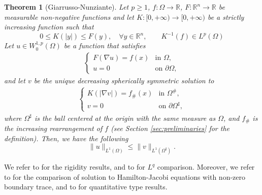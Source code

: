 \documentclass[oneside,a4paper,12pt,notitlepage]{article}
\newtheorem{theorem}{Theorem}[section]
\theoremstyle{definition}
\newcommand{\R}{\mathbb{R}}
\begin{document}
\begin{theorem}[Giarrusso-Nunziante]
  Let $p\geq 1$, $f: \Omega \rightarrow \R$, $F:\R^n\rightarrow \R$ be measurable non-negative functions and let $K:[0,+\infty)\rightarrow [0,+\infty)$ be a strictly increasing  function such that
    \[
0 \leq K(|y|) \leq F(y), \quad \forall y \in \mathbb{R}^n, \quad \quad K^{-1}(f) \in L^p(\Omega)
\]
    Let $u \in W^{1,p}_{0}(\Omega)$ be a function that satisfies
    \begin{align}
\label{hamilton_jacobi}
    \begin{cases}
        F(\nabla u) = f(x) & \text{in } \Omega, \\
        u = 0 & \text{on } \partial \Omega,
    \end{cases}
\end{align}
and let $v$ be the unique decreasing spherically symmetric solution to
\begin{align}
\label{hamilton_jacoby_sym}
    \begin{cases}
        K(|\nabla v|) = f_{\#}(x) & \text{in } \Omega^{\#}, \\
        v = 0 & \text{on } \partial \Omega^{\sharp},
    \end{cases}
\end{align}
where $\Omega^{\sharp}$ is the ball centered at the origin with the same measure as $\Omega$, and $f_{\#}$ is the increasing rearrangement of $f$ (see Section \ref{sec:preliminaries} for the definition). Then, we have the following
\begin{equation*}
\|u\|_{L^1(\Omega)} \le \|v\|_{L^1(\Omega^{\sharp})}.
\end{equation*}
\end{theorem}

We refer to \cite{betta1996uniqueness, mercaldo_remark} for the rigidity results,  and to \cite{ALT89, cianchi1996lq, ferone_posteraro} for $L^q$ comparison. Moreover, we refer to \cite{gentile_amato} for the comparison of solution to Hamilton-Jacobi equations with non-zero boundary trace, and to \cite{amato_barbato} for quantitative type results. 




\end{document}

